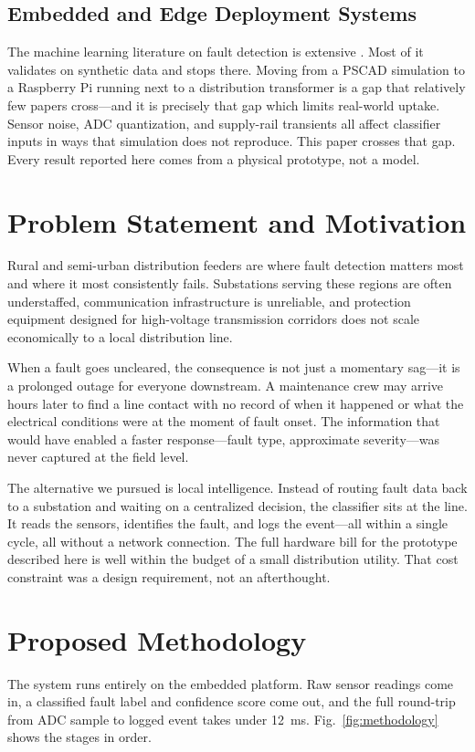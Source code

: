 \documentclass[journal]{IEEEtran}
\begin{document}
\subsection{Embedded and Edge Deployment Systems}
The machine learning literature on fault detection is extensive \cite{ref25}. Most of it validates on synthetic data and stops there. Moving from a PSCAD simulation to a Raspberry Pi running next to a distribution transformer is a gap that relatively few papers cross---and it is precisely that gap which limits real-world uptake. Sensor noise, ADC quantization, and supply-rail transients all affect classifier inputs in ways that simulation does not reproduce. This paper crosses that gap. Every result reported here comes from a physical prototype, not a model.


\section{Problem Statement and Motivation}
Rural and semi-urban distribution feeders are where fault detection matters most and where it most consistently fails. Substations serving these regions are often understaffed, communication infrastructure is unreliable, and protection equipment designed for high-voltage transmission corridors does not scale economically to a local distribution line.

When a fault goes uncleared, the consequence is not just a momentary sag---it is a prolonged outage for everyone downstream. A maintenance crew may arrive hours later to find a line contact with no record of when it happened or what the electrical conditions were at the moment of fault onset. The information that would have enabled a faster response---fault type, approximate severity---was never captured at the field level.

The alternative we pursued is local intelligence. Instead of routing fault data back to a substation and waiting on a centralized decision, the classifier sits at the line. It reads the sensors, identifies the fault, and logs the event---all within a single cycle, all without a network connection. The full hardware bill for the prototype described here is well within the budget of a small distribution utility. That cost constraint was a design requirement, not an afterthought.


\section{Proposed Methodology}
The system runs entirely on the embedded platform. Raw sensor readings come in, a classified fault label and confidence score come out, and the full round-trip from ADC sample to logged event takes under 12~ms. Fig.~\ref{fig:methodology} shows the stages in order.
\end{document}
